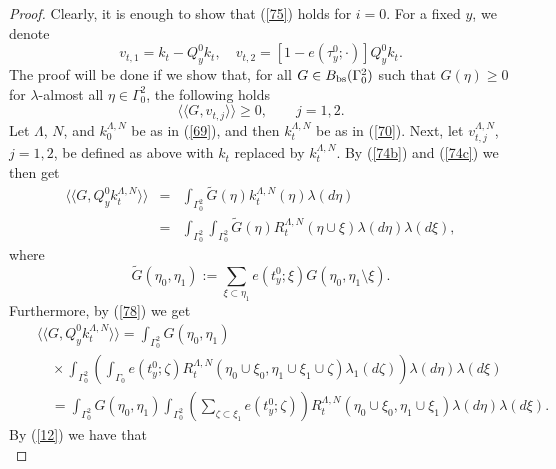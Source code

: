 \documentclass[reqno,11pt]{amsart}
\theoremstyle{definition}
\theoremstyle{remark}
\numberwithin{equation}{section}
\begin{document}
\begin{proof}
Clearly, it is enough to show that (\ref{75}) holds for $i=0$. For a
fixed $y$, we denote
\[
v_{t,1} = k_t - Q^0_y k_t, \quad v_{t,2} =  [1- e(\tau^0_y;\cdot)]
Q^0_y k_t.
\]
The proof will be done if we show that, for all $G\in B_{\rm
bs}(\Gamma^2_0)$ such that $G(\eta) \geq 0$ for $\lambda$-almost all
$\eta\in \Gamma_0^2$, the following holds
\begin{equation}
  \label{76}
\langle \! \langle G, v_{t,j} \rangle \! \rangle \geq 0, \qquad
j=1,2.
\end{equation}
Let $\Lambda$, $N$, and $k_0^{\Lambda,N}$ be as in (\ref{69}), and
then $k_t^{\Lambda,N}$ be as in (\ref{70}). Next, let
$v_{t,j}^{\Lambda,N}$, $j=1,2$, be defined as above with $k_t$
replaced by $k_t^{\Lambda,N}$. By (\ref{74b}) and (\ref{74c}) we
then get
\begin{eqnarray}
  \label{78}
\langle \! \langle G, Q^0_y k^{\Lambda,N}_t \rangle \! \rangle & = &
\int_{\Gamma_0^2} \widetilde{G}(\eta) k^{\Lambda,N}_t (\eta)
\lambda(d \eta) \\[.2cm]
& = & \int_{\Gamma_0^2} \int_{\Gamma_0^2} \widetilde{G}(\eta)
R^{\Lambda,N}_t (\eta \cup \xi) \lambda (d\eta) \lambda (d\xi),
\nonumber
\end{eqnarray}
where
\begin{equation*}
  
  \widetilde{G}(\eta_0,\eta_1):=\sum_{\xi\subset \eta_1} e(t^0_y; \xi) G(\eta_0 , \eta_1 \setminus
\xi).
\end{equation*}
Furthermore, by (\ref{78}) we get
\begin{eqnarray}
  \label{78b}
& & \langle \! \langle G, Q^0_y k^{\Lambda,N}_t \rangle \! \rangle
=  \int_{\Gamma_0^2} G(\eta_0, \eta_1) \\[.2cm] & & \quad
 \times \int_{\Gamma_0^2} \left(
\int_{\Gamma_0} e(t^0_y;\zeta) R^{\Lambda,N}_t(\eta_0\cup \xi_0,
\eta_1 \cup \xi_1 \cup \zeta) \lambda_1 ( d \zeta) \right)
\lambda(d\eta) \lambda ( d \xi) \nonumber \\[.2cm]
& & \quad =  \int_{\Gamma_0^2} G(\eta_0, \eta_1) \int_{\Gamma_0^2}
\left( \sum_{\zeta\subset \xi_1} e(t^0_y;\zeta)\right)
R^{\Lambda,N}_t(\eta_0\cup \xi_0, \eta_1 \cup \xi_1) \lambda(d\eta)
\lambda ( d \xi).\nonumber \qquad
\end{eqnarray}
By (\ref{12}) we have that
\begin{equation*}
  

\end{equation*}
\end{proof}
\end{document}
